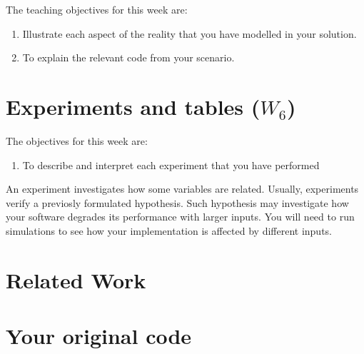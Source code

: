\documentclass[a4paper,12pt]{report}
\begin{document}
The teaching objectives for this week are:
\begin{enumerate}
 \item Illustrate each aspect of the reality that you have 
 modelled in your solution.
\item To explain the relevant code from your scenario.
\end{enumerate}



\chapter{Experiments and tables ($W_{6}$)}

The objectives for this week are:
\begin{enumerate}
 \item To describe and interpret each experiment that you have performed
\end{enumerate}

An experiment investigates how some variables are related. 
Usually, experiments verify a previosly formulated hypothesis.
Such hypothesis may investigate how your software degrades its performance with larger inputs.
You will need to run simulations to see how your implementation is affected by different inputs.



\chapter{Related Work}



\appendix

\chapter{Your original code}
\label{app:code}


\end{document}
